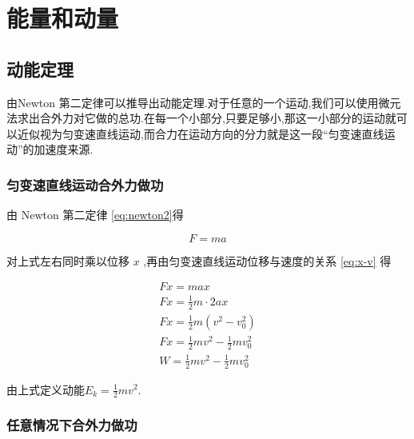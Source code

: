 \chapter{能量和动量}
\section{动能定理}

由Newton 第二定律可以推导出动能定理.对于任意的一个运动,我们可以使用微元法求出合外力对它做的总功.在每一个小部分,只要足够小,那这一小部分的运动就可以近似视为匀变速直线运动,而合力在运动方向的分力就是这一段``匀变速直线运动''的加速度来源.

\subsection{匀变速直线运动合外力做功}

由 Newton 第二定律 \eqref{eq:newton2}得

\begin{equation}
  F=ma
  \label{eq:newtonK}
\end{equation}

对上式左右同时乘以位移 $x$ ,再由匀变速直线运动位移与速度的关系 \eqref{eq:x-v} 得

\begin{gather}
  Fx=max \\
  Fx=\frac{1}{2}m\cdot 2ax\\
  Fx=\frac{1}{2}m(v^2-v_0^2)\\
  Fx=\frac{1}{2}mv^2-\frac{1}{2}mv_0^2\\
  W=\frac{1}{2}mv^2-\frac{1}{2}mv_0^2
\end{gather}

由上式定义动能$E_k=\frac{1}{2}mv^2$.

\subsection{任意情况下合外力做功}

